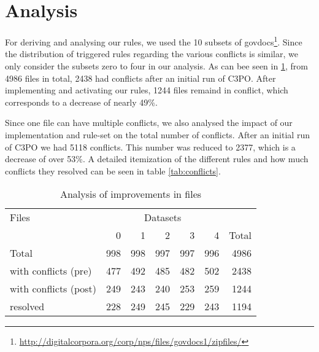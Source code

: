 \documentclass[a4paper,12pt]{article}
\begin{document}
\section{Analysis}

For deriving and analysing our rules, we used the 10 subsets of govdocs\footnote{\url{http://digitalcorpora.org/corp/nps/files/govdocs1/zipfiles/}}.
Since the distribution of triggered rules regarding the various conflicts is similar, we only consider the subsets zero to four in our analysis.
As can bee seen in \ref{tab:files}, from 4986 files in total, 2438 had conflicts after an initial run of C3PO. After implementing and activating our rules, 1244 files remaind in conflict, which corresponds to a decrease of nearly 49\%.

Since one file can have multiple conflicts, we also analysed the impact of our implementation and rule-set on the total number of conflicts.
After an initial run of C3PO we had 5118 conflicts. This number was reduced to 2377, which is a decrease of over 53\%.
A detailed itemization of the different rules and how much conflicts they resolved can be seen in table \ref{tab:conflicts}.

\begin{table}[ht]
\begin{center}

\begin{tabular}[h]{l||r|r|r|r|r||r}
Files &  \multicolumn{5}{c}{Datasets} \\
        & 0 & 1 & 2 & 3 & 4 & Total \\
\hline
Total & 998 & 998 & 997 & 997 & 996 & 4986\\ 
\hline
with conflicts (pre) & 477 &	492 & 485 & 482	& 502 &	2438\\ 
with conflicts (post) & 249	& 243 &	240 & 253 &	259 & 1244\\
\hline
resolved & 228 & 249 & 245 & 229 & 243 & 1194

\end{tabular}
\end{center}
\caption{Analysis of improvements in files}
\label{tab:files}
\end{table}
\end{document}
